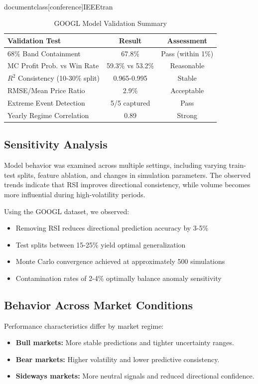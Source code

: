 \\documentclass[conference]{IEEEtran}
\begin{document}
\begin{table}[H]
\caption{GOOGL Model Validation Summary}
\begin{center}
\begin{tabular}{|l|c|c|}
\hline
\textbf{Validation Test} & \textbf{Result} & \textbf{Assessment} \\
\hline
68\% Band Containment & 67.8\% & Pass (within 1\%) \\
\hline
MC Profit Prob. vs Win Rate & 59.3\% vs 53.2\% & Reasonable \\
\hline
$R^2$ Consistency (10-30\% split) & 0.965-0.995 & Stable \\
\hline
RMSE/Mean Price Ratio & 2.9\% & Acceptable \\
\hline
Extreme Event Detection & 5/5 captured & Pass \\
\hline
Yearly Regime Correlation & 0.89 & Strong \\
\hline
\end{tabular}
\label{tab:googl_validation}
\end{center}
\end{table}

\subsection{Sensitivity Analysis}
Model behavior was examined across multiple settings, including varying train-test splits, feature ablation, and changes in simulation parameters. The observed trends indicate that RSI improves directional consistency, while volume becomes more influential during high-volatility periods.

Using the GOOGL dataset, we observed:
\begin{itemize}
    \item Removing RSI reduces directional prediction accuracy by 3-5\%
    \item Test splits between 15-25\% yield optimal generalization
    \item Monte Carlo convergence achieved at approximately 500 simulations
    \item Contamination rates of 2-4\% optimally balance anomaly sensitivity
\end{itemize}

\subsection{Behavior Across Market Conditions}
Performance characteristics differ by market regime:
\begin{itemize}
    \item \textbf{Bull markets:} More stable predictions and tighter uncertainty ranges.
    \item \textbf{Bear markets:} Higher volatility and lower predictive consistency.
    \item \textbf{Sideways markets:} More neutral signals and reduced directional confidence.
\end{itemize}
\end{document}
